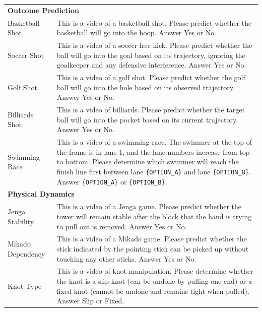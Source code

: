 \begin{table}[!t]
\begin{tabular}{p{} p{}}
        \multicolumn{2}{l}{\textbf{Outcome Prediction}} \\
        \quad Basketball Shot
        & This is a video of a basketball shot. Please predict whether the basketball will go into the hoop. Answer Yes or No. \\

        \quad Soccer Shot
        & This is a video of a soccer free kick. Please predict whether the ball will go into the goal based on its trajectory, ignoring the goalkeeper and any defensive interference. Answer Yes or No. \\

        \quad Golf Shot
        & This is a video of a golf shot. Please predict whether the golf ball will go into the hole based on its observed trajectory. Answer Yes or No. \\

        \quad Billiards Shot
        & This is a video of billiards. Please predict whether the target ball will go into the pocket based on its current trajectory. Answer Yes or No. \\

        \quad Swimming Race
        & This is a video of a swimming race. The swimmer at the top of the frame is in lane 1, and the lane numbers increase from top to bottom. Please determine which swimmer will reach the finish line first between lane \texttt{\{OPTION\_A\}} and lane \texttt{\{OPTION\_B\}}. Answer \texttt{\{OPTION\_A\}} or \texttt{\{OPTION\_B\}}. \\
        \midrule

        \multicolumn{2}{l}{\textbf{Physical Dynamics}} \\
        \quad Jenga Stability
        & This is a video of a Jenga game. Please predict whether the tower will remain stable after the block that the hand is trying to pull out is removed. Answer Yes or No. \\

        \quad Mikado Dependency
        & This is a video of a Mikado game. Please predict whether the stick indicated by the pointing stick can be picked up without touching any other sticks. Answer Yes or No. \\

        \quad Knot Type
        & This is a video of knot manipulation. Please determine whether the knot is a slip knot (can be undone by pulling one end) or a fixed knot (cannot be undone and remains tight when pulled). Answer Slip or Fixed. \\
        \bottomrule
    \end{tabular}
\end{table}

